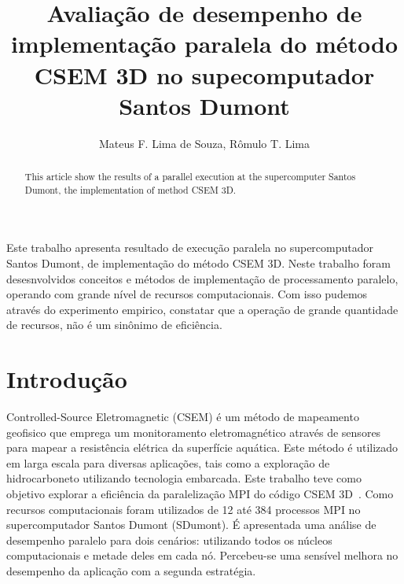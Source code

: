 \documentclass[12pt]{article}
\title{Avaliação de desempenho de implementação paralela do método CSEM 3D no supecomputador Santos Dumont}
\author{Mateus F. Lima de Souza\inst{1,2}, Rômulo T. Lima\inst{1,3}}
\begin{document}
 

\maketitle

\begin{abstract}
  This article show the results of a parallel execution at the supercomputer Santos Dumont, the implementation of method CSEM 3D.
\end{abstract}
     
\begin{resumo} 
Este trabalho apresenta resultado de execução paralela no supercomputador Santos Dumont, de implementação do método CSEM 3D. Neste trabalho foram desesnvolvidos conceitos e métodos de implementação de processamento paralelo, operando com grande nível de recursos computacionais. Com isso pudemos através do experimento empirico, constatar que a operação de grande quantidade de recursos, não é um sinônimo de eficiência.
\end{resumo}

\section{Introdução}
Controlled-Source Eletromagnetic (CSEM) é um método de mapeamento geofisico que emprega um monitoramento eletromagnético através de sensores para mapear a resistência elétrica da superfície aquática. Este método é utilizado em larga escala para diversas aplicações, tais como a exploração de hidrocarboneto utilizando tecnologia embarcada. Este trabalho teve como objetivo explorar a eficiência da paralelização MPI do código CSEM 3D~\cite{zerilli2014broadband,zerilli2016broadband}. Como recursos computacionais foram utilizados de 12 até 384 processos MPI no supercomputador Santos Dumont (SDumont).  É apresentada uma análise de desempenho paralelo para dois cenários: utilizando todos os núcleos computacionais e metade deles em cada nó. Percebeu-se uma sensível melhora no desempenho da aplicação com a segunda estratégia.
\end{document}
